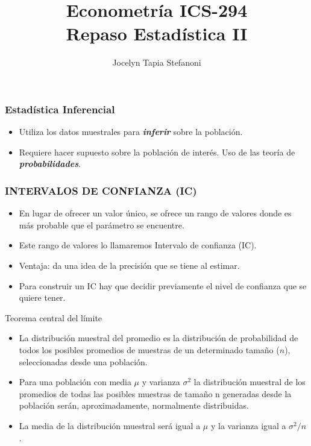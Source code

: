\documentclass{beamer}
\title[ICS-162]{Econometría ICS-294\\ \small{Repaso Estadística II}}
\author{Jocelyn Tapia Stefanoni}
\institute[USM]
{Universidad Técnica Federico Santa María\\ %
	\medskip
	\textit{} %
	
}
\date{}
\begin{document}
\begin{frame}
	\titlepage %
\end{frame}

\begin{frame}
\frametitle{Estadística  Inferencial}

\begin{itemize}
\item  Utiliza los datos muestrales para \textit{\textbf{inferir}} sobre la población.
\item Requiere hacer supuesto sobre la población de interés. Uso de
las teoría de \textit{\textbf{probabilidades}}.
\end{itemize}
\end{frame}

\begin{frame}

\frametitle{INTERVALOS DE CONFIANZA (IC)}
\begin{itemize}
\item En lugar de ofrecer un valor único, se ofrece un rango de valores donde es más probable que el parámetro se encuentre.
\item Este rango de valores lo llamaremos Intervalo de confianza (IC).
\item Ventaja: da una idea de la precisión que se tiene al estimar.
\item Para construir un IC hay que decidir previamente el nivel de confianza que se quiere tener.
\end{itemize}
\end{frame}



\begin{frame}{Teorema central del l\'imite }
    \begin{itemize}
% 
    \item La distribución muestral del promedio es la distribución de probabilidad de todos los posibles promedios de muestras de un determinado tamaño ($n$), seleccionadas desde una población.
        \item Para una población con media $\mu$ y varianza $\sigma^2$ la distribución muestral de los promedios de todas las posibles muestras de tamaño n generadas desde la población serán, aproximadamente, normalmente distribuidas.
        
\item La media de la distribución muestral será igual a $\mu$ y la varianza  igual a $\sigma^2/n$.
    \end{itemize}
\end{frame}
\end{document}
